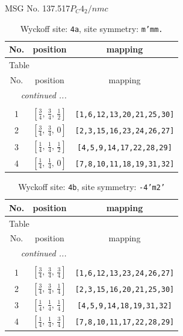 \documentclass[fleqn,8pt]{jsarticle}
\begin{document}
\setcounter{MaxMatrixCols}{32}

\renewcommand{\tablename}{Table~}
\renewcommand{\figurename}{Figure~}
\begin{center}
\LARGE
MSG No. 137.517\quad$P_{C}4_{2}/nmc$
\end{center}
\renewcommand{\arraystretch}{1.2}
\begin{longtable}{ccc}
\caption{Wyckoff site: {\tt 4a}, site symmetry: {\tt m'mm.}}
 \\
 \hline \hline
No. & position & mapping \\ \hline \endfirsthead

\multicolumn{2}{l}{\tablename\ \thetable{}} \\
 \hline \hline
No. & position & mapping \\ \hline \endhead

 \hline \hline
\multicolumn{2}{r}{\footnotesize\it continued ...} \\ \endfoot

 \hline \hline
\multicolumn{2}{r}{} \\ \endlastfoot

1 & $\left[ \frac{3}{4},\, \frac{3}{4},\, \frac{1}{2} \right]$ & {\tt [1,6,12,13,20,21,25,30]} \\ \hline
2 & $\left[ \frac{3}{4},\, \frac{3}{4},\, 0 \right]$ & {\tt [2,3,15,16,23,24,26,27]} \\ \hline
3 & $\left[ \frac{1}{4},\, \frac{1}{4},\, \frac{1}{2} \right]$ & {\tt [4,5,9,14,17,22,28,29]} \\ \hline
4 & $\left[ \frac{1}{4},\, \frac{1}{4},\, 0 \right]$ & {\tt [7,8,10,11,18,19,31,32]} \\
\end{longtable}
\renewcommand{\arraystretch}{1.2}
\begin{longtable}{ccc}
\caption{Wyckoff site: {\tt 4b}, site symmetry: {\tt -4'm2'}}
 \\
 \hline \hline
No. & position & mapping \\ \hline \endfirsthead

\multicolumn{2}{l}{\tablename\ \thetable{}} \\
 \hline \hline
No. & position & mapping \\ \hline \endhead

 \hline \hline
\multicolumn{2}{r}{\footnotesize\it continued ...} \\ \endfoot

 \hline \hline
\multicolumn{2}{r}{} \\ \endlastfoot

1 & $\left[ \frac{3}{4},\, \frac{3}{4},\, \frac{3}{4} \right]$ & {\tt [1,6,12,13,23,24,26,27]} \\ \hline
2 & $\left[ \frac{3}{4},\, \frac{3}{4},\, \frac{1}{4} \right]$ & {\tt [2,3,15,16,20,21,25,30]} \\ \hline
3 & $\left[ \frac{1}{4},\, \frac{1}{4},\, \frac{1}{4} \right]$ & {\tt [4,5,9,14,18,19,31,32]} \\ \hline
4 & $\left[ \frac{1}{4},\, \frac{1}{4},\, \frac{3}{4} \right]$ & {\tt [7,8,10,11,17,22,28,29]} \\
\end{longtable}
\end{document}
